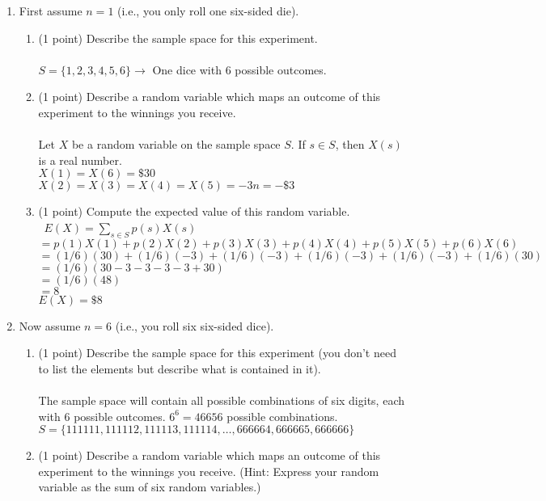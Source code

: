 \documentclass[12pt]{elsart}
\begin{document}
\begin{enumerate}
   \item  First assume $n=1$ (i.e., you only roll one six-sided die). 
\begin{enumerate}
   	\item  (1 point) Describe the sample space for this experiment.\\\\
		$\boxed{S=\{1,2,3,4,5,6\}} \rightarrow$ One dice with 6 possible outcomes.\\
  	 \item (1 point) Describe a random variable which maps an outcome of this experiment to the winnings you receive.\\\\
		Let $X$ be a random variable on the sample space $S$. If $s\in S$, then $X(s)$ is a real number.\\
		$X(1)=X(6)=\$ 30$\\
		$X(2)=X(3)=X(4)=X(5)=-3n=-\$ 3$\\
  	 \item (1 point)  Compute the expected value of this random variable.\\\
		$E(X) = \sum\limits_{s\in S}p(s)X(s)$\\
		$=p(1)X(1)+p(2)X(2)+p(3)X(3)+p(4)X(4)+p(5)X(5)+p(6)X(6)$\\
		$=(1/6)(30)+(1/6)(-3)+(1/6)(-3)+(1/6)(-3)+(1/6)(-3)+(1/6)(30)$\\
		$=(1/6)(30-3-3-3-3+30)$\\
		$=(1/6)(48)$\\
		$=8$\\
		$\boxed{E(X)=\$ 8}$\\
\end{enumerate}
\newpage
   \item  Now assume $n=6$ (i.e., you roll six six-sided dice). 
\begin{enumerate}
   	\item (1 point) Describe the sample space for this experiment (you don't need to list the elements but describe what is contained in it).\\\\
		The sample space will contain all possible combinations of six digits, each with 6 possible outcomes. $6^6=46656$ possible combinations.\\
		$S=\{ 111111,111112,111113,111114, \ldots ,666664,666665,666666\} $\\
   	\item (1 point) Describe a random variable which maps an outcome of this experiment to the winnings you receive. (Hint: Express your random variable as the sum of six random variables.)\\\\

\end{enumerate}
\end{enumerate}
\end{document}
